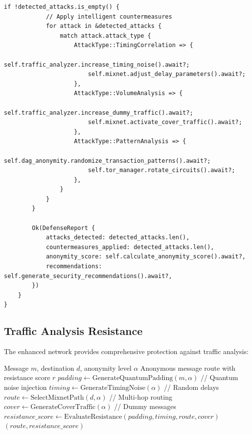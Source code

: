 \documentclass[12pt,a4paper]{article}
\begin{document}
\begin{lstlisting}[style=rustcode, caption=Enhanced Anonymity Network]
        if !detected_attacks.is_empty() {
            // Apply intelligent countermeasures
            for attack in &detected_attacks {
                match attack.attack_type {
                    AttackType::TimingCorrelation => {
                        self.traffic_analyzer.increase_timing_noise().await?;
                        self.mixnet.adjust_delay_parameters().await?;
                    },
                    AttackType::VolumeAnalysis => {
                        self.traffic_analyzer.increase_dummy_traffic().await?;
                        self.mixnet.activate_cover_traffic().await?;
                    },
                    AttackType::PatternAnalysis => {
                        self.dag_anonymity.randomize_transaction_patterns().await?;
                        self.tor_manager.rotate_circuits().await?;
                    },
                }
            }
        }
        
        Ok(DefenseReport {
            attacks_detected: detected_attacks.len(),
            countermeasures_applied: detected_attacks.len(),
            anonymity_score: self.calculate_anonymity_score().await?,
            recommendations: self.generate_security_recommendations().await?,
        })
    }
}
\end{lstlisting}

\subsection{Traffic Analysis Resistance}

The enhanced network provides comprehensive protection against traffic analysis:

\begin{algorithm}
\caption{Multi-Layer Traffic Analysis Resistance}
\begin{algorithmic}[1]
\REQUIRE Message $m$, destination $d$, anonymity level $\alpha$
\ENSURE Anonymous message route with resistance score $r$
\STATE $padding \leftarrow \text{GenerateQuantumPadding}(m, \alpha)$ // Quantum noise injection
\STATE $timing \leftarrow \text{GenerateTimingNoise}(\alpha)$ // Random delays
\STATE $route \leftarrow \text{SelectMixnetPath}(d, \alpha)$ // Multi-hop routing
\STATE $cover \leftarrow \text{GenerateCoverTraffic}(\alpha)$ // Dummy messages
\STATE $resistance\_score \leftarrow \text{EvaluateResistance}(padding, timing, route, cover)$
\RETURN $(route, resistance\_score)$
\end{algorithmic}
\end{algorithm}
\end{document}
